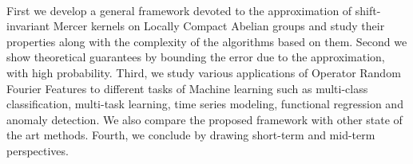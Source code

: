 \paragraph{}
First we develop a general framework devoted to the approximation of
shift-invariant Mercer kernels on Locally Compact Abelian groups and study
their properties along with the complexity of the algorithms based on them.
Second we show theoretical guarantees by bounding the error due to the
approximation, with high probability. Third, we study various applications of
Operator Random Fourier Features to different tasks of Machine learning such as
multi-class classification, multi-task learning, time series modeling,
functional regression and anomaly detection. We also compare the proposed
framework with other state of the art methods. Fourth, we conclude by drawing
short-term and mid-term perspectives.

\endgroup

\vfill
